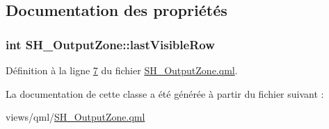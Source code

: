 \subsection{Documentation des propriétés}
\hypertarget{classSH__OutputZone_ae324bcdd20ad4a9e435678d045964dc9}{
\subsubsection[{last\-Visible\-Row}]{\setlength{\rightskip}{0pt plus 5cm}int S\-H\-\_\-\-Output\-Zone\-::last\-Visible\-Row}}\label{classSH__OutputZone_ae324bcdd20ad4a9e435678d045964dc9}


Définition à la ligne \hyperlink{SH__OutputZone_8qml_source_l00007}{7} du fichier \hyperlink{SH__OutputZone_8qml_source}{S\-H\-\_\-\-Output\-Zone.\-qml}.



La documentation de cette classe a été générée à partir du fichier suivant \-:\begin{DoxyCompactItemize}
\item 
views/qml/\hyperlink{SH__OutputZone_8qml}{S\-H\-\_\-\-Output\-Zone.\-qml}\end{DoxyCompactItemize}
